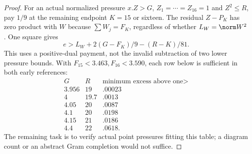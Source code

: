 \begin{proof}
For an actual normalized pressure $x.Z>G$, $Z_1=\cdots=Z_{16}=1$
and $Z^2\le R$, pay $1/9$ at the remaining endpoint $K=15$ or
sixteen. The residual $Z-P_K$ has zero product with $W$ because
$\sum W_j=F_K$, regardless of whether $L_W=\norm W^2$. One square gives
\[
 e>L_W+2(G-F_K)/9-(R-K)/81.
\]
This uses a positive-dual payment, not the invalid subtraction of two
lower pressure bounds. With $F_{15}<3.463,F_{16}<3.590$, each row
below is sufficient in both early references:
\[
\begin{array}{c|c|c}
G&R&\text{minimum excess above one}>\\\hline
3.956&19&.00023\\4&19.7&.0013\\4.05&20&.0087\\
4.1&20&.0198\\4.15&21&.0186\\4.4&22&.0618 .
\end{array}
\]
The remaining task is to verify actual point pressures fitting this
table; a diagram count or an abstract Gram completion would not suffice.
\end{proof}

